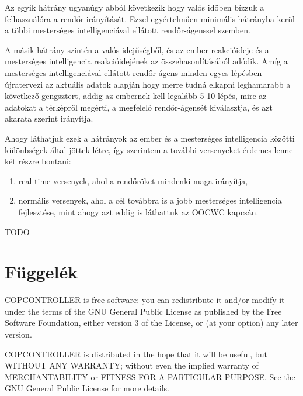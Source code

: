 \documentclass[a4paper,12pt]{report}
\begin{document}
\vspace{2mm}
Az egyik hátrány ugyanúgy abból következik hogy valós időben bízzuk a felhasználóra a rendőr irányítását. Ezzel egyértelműen minimális hátrányba kerül a többi mesterséges intelligenciával ellátott rendőr-ágenssel szemben.

\vspace{2mm}
A másik hátrány szintén a valós-idejűségből, és az ember reakcióideje és a mesterséges intelligencia reakcióidejének az összehasonlításából adódik. Amíg a mesterséges intelligenciával ellátott rendőr-ágens minden egyes lépésben újratervezi az aktuális adatok alapján hogy merre tudná elkapni leghamarabb a következő gengsztert, addig az embernek kell legalább 5-10 lépés, mire az adatokat a térképről megérti, a megfelelő rendőr-ágensét kiválasztja, és azt akarata szerint irányítja.

\vspace{2mm}
Ahogy láthatjuk ezek a hátrányok az ember és a mesterséges intelligencia közötti különbségek által jöttek létre, így szerintem a további versenyeket érdemes lenne két részre bontani: 
\begin{enumerate} 
\item real-time versenyek, ahol a rendőröket mindenki maga irányítja, 
\item normális versenyek, ahol a cél továbbra is a jobb mesterséges intelligencia fejlesztése, mint ahogy azt eddig is láthattuk az OOCWC kapcsán.
\end{enumerate}
TODO

\newpage
{}

\begin{singlespace}

\end{singlespace}

\chapter*{Függelék}

\noindent
COPCONTROLLER is free software: you can redistribute it and/or modify
it under the terms of the GNU General Public License as published by
the Free Software Foundation, either version 3 of the License, or
(at your option) any later version.

\noindent
COPCONTROLLER is distributed in the hope that it will be useful,
but WITHOUT ANY WARRANTY; without even the implied warranty of
MERCHANTABILITY or FITNESS FOR A PARTICULAR PURPOSE.  See the
GNU General Public License for more details.
\end{document}
